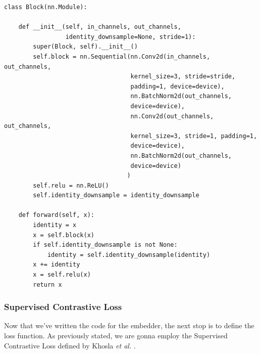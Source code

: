 \begin{lstlisting}[style=mypython, xleftmargin=.03\textwidth, xrightmargin=.03\textwidth]
class Block(nn.Module):
    
    def __init__(self, in_channels, out_channels, 
                 identity_downsample=None, stride=1):
        super(Block, self).__init__()
        self.block = nn.Sequential(nn.Conv2d(in_channels, out_channels, 
                                   kernel_size=3, stride=stride, 
                                   padding=1, device=device),
                                   nn.BatchNorm2d(out_channels, 
                                   device=device),
                                   nn.Conv2d(out_channels, out_channels, 
                                   kernel_size=3, stride=1, padding=1, 
                                   device=device),
                                   nn.BatchNorm2d(out_channels, 
                                   device=device)
                                  )
        self.relu = nn.ReLU()
        self.identity_downsample = identity_downsample
        
    def forward(self, x):
        identity = x
        x = self.block(x)
        if self.identity_downsample is not None:
            identity = self.identity_downsample(identity)
        x += identity
        x = self.relu(x)
        return x
\end{lstlisting}

\subsubsection{Supervised Contrastive Loss}
Now that we've written the code for the embedder, the next stop is to define the loss function. As previously stated, we are gonna employ the Supervised Contrastive Loss defined by Khosla \textit{et al.} \cite{khosla2020supervised}. \\

